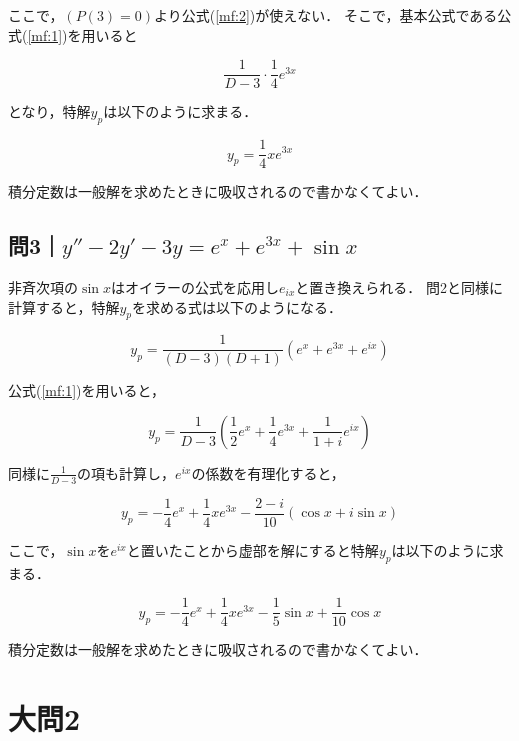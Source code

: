 \documentclass[a4paper,11pt]{bxjsarticle}
\begin{document}
ここで，$(P(3)= 0)$より公式(\ref{mf:2})が使えない．
そこで，基本公式である公式(\ref{mf:1})を用いると

\begin{equation}
  \frac{1}{D-3}\cdot\frac{1}{4}e^{3x}
\end{equation}

となり，特解$y_p$は以下のように求まる．

\begin{equation}
  y_p=\frac{1}{4}xe^{3x}
\end{equation}

積分定数は一般解を求めたときに吸収されるので書かなくてよい．

\subsection{問3｜$y''-2y'-3y=e^x+e^{3x}+\sin x$}
非斉次項の$\sin x$はオイラーの公式を応用し$e_{ix}$と置き換えられる．
問2と同様に計算すると，特解$y_p$を求める式は以下のようになる．

\begin{equation}
  y_p = \frac{1}{(D - 3)(D + 1)}(e^x + e^{3x} + e^{ix})
\end{equation}

公式(\ref{mf:1})を用いると，

\begin{equation}
  y_p = \frac{1}{D - 3}(\frac{1}{2}e^x + \frac{1}{4}e^{3x} + \frac{1}{1+i}e^{ix})
\end{equation}

同様に$\frac{1}{D-3}$の項も計算し，$e^{ix}$の係数を有理化すると，

\begin{equation}
  y_p = -\frac{1}{4}e^x + \frac{1}{4}xe^{3x} - \frac{2 - i}{10}(\cos x + i\sin x)
\end{equation}

ここで，$\sin x$を$e^{ix}$と置いたことから虚部を解にすると特解$y_p$は以下のように求まる．

\begin{equation}
  y_p = -\frac{1}{4}e^x + \frac{1}{4}xe^{3x} - \frac{1}{5}\sin x + \frac{1}{10}\cos x
\end{equation}

積分定数は一般解を求めたときに吸収されるので書かなくてよい．

\section{大問2}
\subsection{}




 
\end{document}
